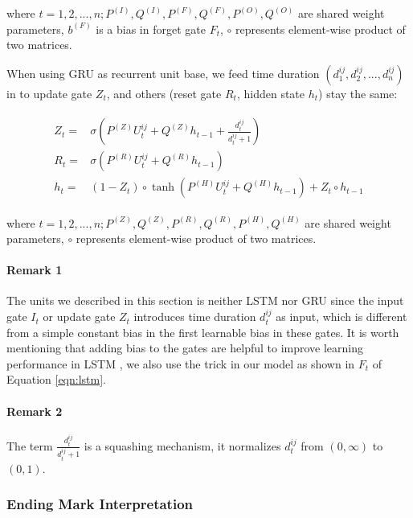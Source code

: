 where $t = 1, 2, ..., n; P^{(I)}, Q^{(I)}, P^{(F)}, Q^{(F)}, P^{(O)}, Q^{(O)}$ are shared weight parameters, 
$b^{(F)}$ is a bias in forget gate $F_t$,
$\circ$ represents element-wise product of two matrices.

When using GRU as recurrent unit base, we feed time duration $(d^{ij}_1, d^{ij}_2, ..., d^{ij}_n)$
in to update gate $Z_t$, and others (reset gate $R_t$, hidden state $h_t$) stay the same:

\begin{align}
\label{eqn:gru}
\begin{split}
    Z_t =& \sigma ( P^{(Z)} U^{ij}_t + Q^{(Z)} h_{t-1} + \frac{d^{ij}_t}{d^{ij}_t + 1} ) \\
    R_t =& \sigma ( P^{(R)} U^{ij}_t + Q^{(R)} h_{t-1} ) \\
    h_t =& ( 1 - Z_t ) \circ \tanh ( P^{(H)} U^{ij}_t + Q^{(H)} h_{t-1} ) + Z_t \circ h_{t-1}
\end{split}
\end{align}

where $t = 1, 2, ..., n; P^{(Z)}, Q^{(Z)}, P^{(R)}, Q^{(R)}, P^{(H)}, Q^{(H)}$ are shared weight parameters, 
$\circ$ represents element-wise product of two matrices.

\paragraph{Remark 1} The units we described in this section is neither LSTM nor GRU since
the input gate $I_t$ or update gate $Z_t$ introduces time duration $d^{ij}_t$ as input,
which is different from a simple constant bias in the first learnable bias in these gates. 
It is worth mentioning that adding bias to the gates are helpful to 
improve learning performance in LSTM \cite{Jozefowicz:2015:EER:3045118.3045367}, 
we also use the trick in our model as shown in $F_t$ of Equation \ref{eqn:lstm}.

\paragraph{Remark 2} The term $\frac{d^{ij}_t}{d^{ij}_t + 1}$ is a squashing mechanism,
it normalizes $d^{ij}_t$ from $(0, \infty)$ to $(0, 1)$.

\subsubsection{Ending Mark Interpretation}
\label{sec:mark-interpretation}

